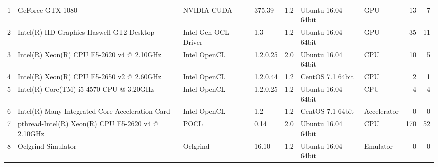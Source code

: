 \begin{tabular}{rllllllrr}
\toprule
 1 &                                   GeForce GTX 1080 &           NVIDIA CUDA &    375.39 &  1.2 &  Ubuntu 16.04 64bit &          GPU &   13 &   7 \\
 2 &           Intel(R) HD Graphics Haswell GT2 Desktop &  Intel Gen OCL Driver &       1.3 &  1.2 &  Ubuntu 16.04 64bit &          GPU &   35 &  11 \\
 3 &          Intel(R) Xeon(R) CPU E5-2620 v4 @ 2.10GHz &          Intel OpenCL &  1.2.0.25 &  2.0 &  Ubuntu 16.04 64bit &          CPU &   10 &   5 \\
 4 &          Intel(R) Xeon(R) CPU E5-2650 v2 @ 2.60GHz &          Intel OpenCL &  1.2.0.44 &  1.2 &    CentOS 7.1 64bit &          CPU &    2 &   1 \\
 5 &            Intel(R) Core(TM) i5-4570 CPU @ 3.20GHz &          Intel OpenCL &  1.2.0.25 &  1.2 &  Ubuntu 16.04 64bit &          CPU &    4 &   4 \\
 6 &    Intel(R) Many Integrated Core Acceleration Card &          Intel OpenCL &       1.2 &  1.2 &    CentOS 7.1 64bit &  Accelerator &    0 &   0 \\
 7 &  pthread-Intel(R) Xeon(R) CPU E5-2620 v4 @ 2.10GHz &                  POCL &      0.14 &  2.0 &  Ubuntu 16.04 64bit &          CPU &  170 &  52 \\
 8 &                                 Oclgrind Simulator &              Oclgrind &     16.10 &  1.2 &  Ubuntu 16.04 64bit &     Emulator &    0 &   0 \\
\bottomrule
\end{tabular}
